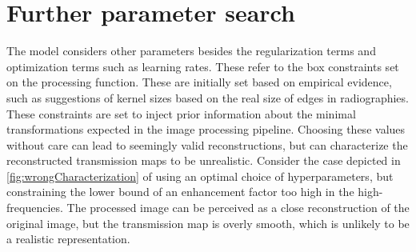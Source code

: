 \documentclass[nomenclature, english, bibtex]{kththesis}
\numberwithin{listing}{chapter}
\begin{document}
\section{Further parameter search}

The model considers other parameters besides the regularization terms and optimization terms such as learning rates.
These refer to the box constraints set on the processing function. These are initially set based on empirical evidence,
such as suggestions of kernel sizes based on the real size of edges in radiographies. These constraints are set to inject
prior information about the minimal transformations expected in the image processing pipeline. Choosing these values without
care can lead to seemingly valid reconstructions, but can characterize the reconstructed transmission maps to be
unrealistic. Consider the case depicted in \autoref{fig:wrongCharacterization} of using an optimal choice of hyperparameters,
but constraining the lower bound of an enhancement factor too high in the high-frequencies. The processed image can
be perceived as a close reconstruction of the original image, but the transmission map is overly smooth, which is unlikely
to be a realistic representation.
\end{document}
